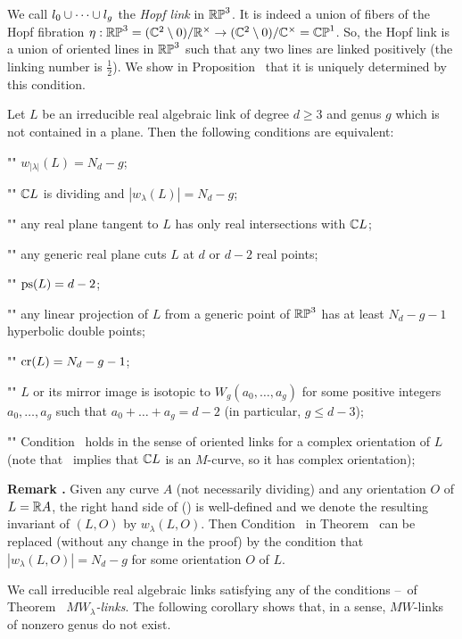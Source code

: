 We call $l_0\cup\dots\cup l_g$ the {\it Hopf link} in $\Bbb{RP}^3$.
It is indeed a union of fibers of the Hopf fibration
$\eta:\Bbb{RP}^3 = (\Bbb C^2\setminus 0)/\Bbb R^\times\to(\Bbb C^2\setminus0)/\Bbb C^\times=\Bbb{CP}^1$.
So, the Hopf link is a union of oriented lines in $\Bbb{RP}^3$ such that any two lines are linked positively
(the linking number is $\frac12$).
We show in Proposition \propHopf\ that it is uniquely determined by this condition.


Let $L$ be an irreducible real algebraic link of degree $d\ge 3$ and genus $g$ which is not contained in a plane.
Then the following conditions are equivalent:
\roster
\item"\CondW"   $w_{|\lambda|}(L)=N_d-g$;
\item"\CondWA"  $\Bbb C L$ is dividing and $|w_\lambda(L)| = N_d-g$;
\item"\CondH"   any real plane tangent to $L$ has only real intersections with $\Bbb C L$;
\item"\CondPSA" any generic real plane cuts $L$ at $d$ or $d-2$ real points;
\item"\CondPS"  $\operatorname{ps}(L) = d-2$;
\item"\CondCrA" any linear projection of $L$ from a generic point of $\Bbb{RP}^3$
                has at least $N_d-g-1$ hyperbolic double points;
\item"\CondCr"  $\operatorname{cr}(L)=N_d-g-1$;
\item"\CondT"   $L$ or its mirror image is isotopic to
                $W_g(a_0,\dots,a_g)$
                for some positive integers $a_0,\dots,a_g$ such that $a_0+\dots+a_g=d-2$
                (in particular, $g\le d-3$);
\item"\CondTA"  Condition \CondT\ holds in the sense of oriented links for a complex
                orientation of $L$ (note that \CondT\ implies that
                $\Bbb C L$ is an $M$-curve, so it has complex orientation);
\endroster
\endproclaim

\smallskip\noindent
{\bf Remark \remWO. } Given any curve $A$ (not necessarily dividing) and any orientation $O$ of $L=\Bbb R A$,
the right hand side of (\eqDefWL) is well-defined %
and we denote the resulting
invariant of $(L,O)$ by $w_\lambda(L,O)$.
Then Condition \CondW\ in Theorem \thAnyGenus\ can be replaced (without any change in the proof)
by the condition that $|w_\lambda(L,O)|=N_d-g$ for some orientation $O$ of $L$.
\smallskip

We call irreducible real algebraic links satisfying any of the conditions
\CondW--\CondTA\ of Theorem \thAnyGenus\ {\it $MW_\lambda$-links}. The following corollary shows that,
in a sense, $MW$-links of nonzero genus do not exist.

